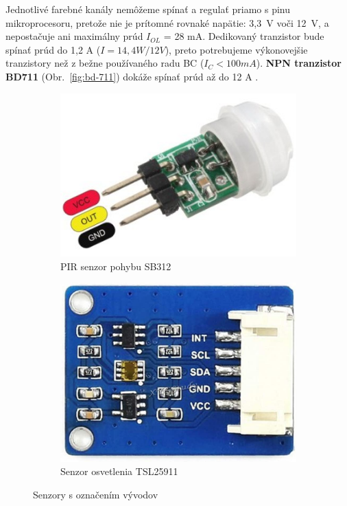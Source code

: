\documentclass[12pt, a4paper]{article}
\begin{document}
Jednotlivé farebné kanály nemôžeme spínať a regulať priamo s pinu mikroprocesoru, pretože nie je prítomné rovnaké napätie: 3,3~V voči 12~V, a nepostačuje ani maximálny prúd $I_{OL}$ = 28 mA. Dedikovaný tranzistor bude spínať prúd do 1,2 A ($I = 14,4W / 12V$), preto potrebujeme výkonovejšie tranzistory než z bežne používaného radu BC ($I_C < 100 mA$). \textbf{NPN tranzistor BD711} (Obr.~\ref{fig:bd-711}) dokáže spínať prúd až do 12 A \cite{noauthor_bd711_nodate}.

\begin{figure}[h]
\centering
\begin{subfigure}[b]{0.4\textwidth}
	\centering
	\includegraphics[width=\textwidth]{assets/pir-sb312.jpg}
	\caption{PIR senzor pohybu SB312}
	\label{fig:pir}
\end{subfigure}
\hfill
\begin{subfigure}[b]{0.4\textwidth}
	\centering
	\includegraphics[width=\textwidth]{assets/tsl25911.jpg}
	\caption{Senzor osvetlenia TSL25911}
	\label{fig:light-sensor}
\end{subfigure}
\caption{Senzory s označením vývodov}
\end{figure}
\end{document}
